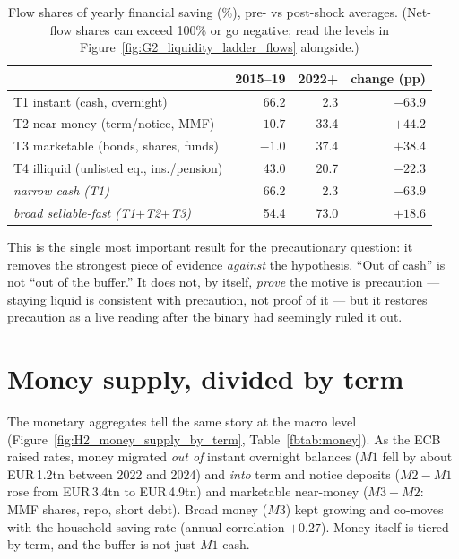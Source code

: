 \documentclass[11pt,a4paper]{article}
\begin{document}
\begin{table}[htbp]\centering\small
\caption{Flow shares of yearly financial saving (\%), pre- vs post-shock
averages. (Net-flow shares can exceed 100\% or go negative; read the levels in
Figure~\ref{fig:G2_liquidity_ladder_flows} alongside.)}\label{fbtab:flows}
\begin{tabular}{@{}lrrr@{}}
\toprule
 & 2015--19 & 2022+ & change (pp) \\
\midrule
T1 instant (cash, overnight)        & 66.2 & 2.3 & $-63.9$ \\
T2 near-money (term/notice, MMF)    & $-10.7$ & 33.4 & $+44.2$ \\
T3 marketable (bonds, shares, funds)& $-1.0$ & 37.4 & $+38.4$ \\
T4 illiquid (unlisted eq., ins./pension) & 43.0 & 20.7 & $-22.3$ \\
\midrule
\emph{narrow cash (T1)}             & 66.2 & 2.3 & $-63.9$ \\
\emph{broad sellable-fast (T1$+$T2$+$T3)} & 54.4 & 73.0 & $+18.6$ \\
\bottomrule
\end{tabular}
\end{table}

This is the single most important result for the precautionary question: it
removes the strongest piece of evidence \emph{against} the hypothesis. ``Out of
cash'' is not ``out of the buffer.'' It does not, by itself, \emph{prove} the
motive is precaution --- staying liquid is consistent with precaution, not proof
of it --- but it restores precaution as a live reading after the binary had
seemingly ruled it out.

\section{Money supply, divided by term}\label{fbsec:money}

The monetary aggregates tell the same story at the macro level
(Figure~\ref{fig:H2_money_supply_by_term}, Table~\ref{fbtab:money}). As the ECB
raised rates, money migrated \emph{out of} instant overnight balances ($M1$ fell
by about EUR\,1.2tn between 2022 and 2024) and \emph{into} term and notice
deposits ($M2-M1$ rose from EUR\,3.4tn to EUR\,4.9tn) and marketable near-money
($M3-M2$: MMF shares, repo, short debt). Broad money ($M3$) kept growing and
co-moves with the household saving rate (annual correlation $+0.27$). Money
itself is tiered by term, and the buffer is not just $M1$ cash.
\end{document}

